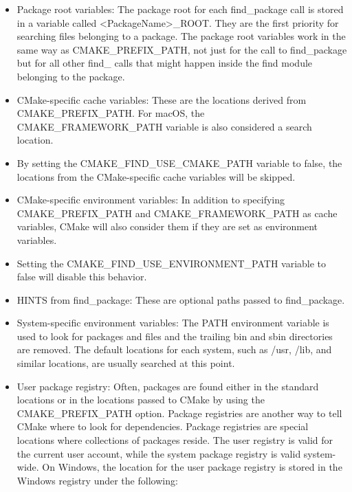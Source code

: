 \begin{itemize}
\item 
Package root variables: The package root for each find\_package call is stored in a variable called <PackageName>\_ROOT. They are the first priority for searching files belonging to a package. The package root variables work in the same way as CMAKE\_PREFIX\_PATH, not just for the call to find\_package but for all other find\_ calls that might happen inside the find module belonging to the package.

\item 
CMake-specific cache variables: These are the locations derived from CMAKE\_PREFIX\_PATH. For macOS, the CMAKE\_FRAMEWORK\_PATH variable is also considered a search location.

\item 
By setting the CMAKE\_FIND\_USE\_CMAKE\_PATH variable to false, the locations from the CMake-specific cache variables will be skipped.

\item 
CMake-specific environment variables: In addition to specifying CMAKE\_PREFIX\_PATH and CMAKE\_FRAMEWORK\_PATH as cache variables, CMake will also consider them if they are set as environment variables.

\item 
Setting the CMAKE\_FIND\_USE\_ENVIRONMENT\_PATH variable to false will disable this behavior.

\item 
HINTS from find\_package: These are optional paths passed to find\_package.

\item 
System-specific environment variables: The PATH environment variable is used to look for packages and files and the trailing bin and sbin directories are removed. The default locations for each system, such as /usr, /lib, and similar locations, are usually searched at this point.

\item 
User package registry: Often, packages are found either in the standard locations or in the locations passed to CMake by using the CMAKE\_PREFIX\_PATH option. Package registries are another way to tell CMake where to look for dependencies. Package registries are special locations where collections of packages reside. The user registry is valid for the current user account, while the system package registry is valid system-wide. On Windows, the location for the user package registry is stored in the Windows registry under the following:


\end{itemize}
